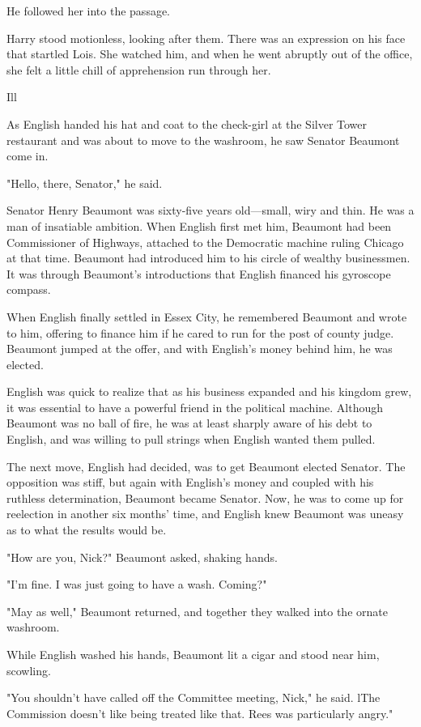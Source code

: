 \documentclass{novel}
\begin{document}
He followed her into the passage.

Harry stood motionless, looking after them. There was an expression on his face that startled Lois. She watched him, and when he went abruptly out of the office, she felt a little chill of apprehension run through her.



Ill

As English handed his hat and coat to the check-girl at the Silver Tower restaurant and was about to move to the washroom, he saw Senator Beaumont come in.

"Hello, there, Senator," he said.

Senator Henry Beaumont was sixty-five years old—small, wiry and thin. He was a man of insatiable ambition. When English first met him, Beaumont had been Commissioner of Highways, attached to the Democratic machine ruling Chicago at that time. Beaumont had introduced him to his circle of wealthy businessmen. It was through Beaumont's introductions that English financed his gyroscope compass.

When English finally settled in Essex City, he remembered Beaumont and wrote to him, offering to finance him if he cared to run for the post of county judge. Beaumont jumped at the offer, and with English's money behind him, he was elected.

English was quick to realize that as his business expanded and his kingdom grew, it was essential to have a powerful friend in the political machine. Although Beaumont was no ball of fire, he was at least sharply aware of his debt to English, and was willing to pull strings when English wanted them pulled.

The next move, English had decided, was to get Beaumont elected Senator. The opposition was stiff, but again with English's money and coupled with his ruthless determination, Beaumont became Senator. Now, he was to come up for reelection in another six months' time, and English knew Beaumont was uneasy as to what the results would be.

"How are you, Nick?" Beaumont asked, shaking hands.

"I'm fine. I was just going to have a wash. Coming?"

"May as well," Beaumont returned, and together they walked into the ornate washroom.

While English washed his hands, Beaumont lit a cigar and stood near him, scowling.

"You shouldn't have called off the Committee meeting, Nick," he said. lThe Commission doesn't like being treated like that. Rees was particularly angry."
\end{document}
